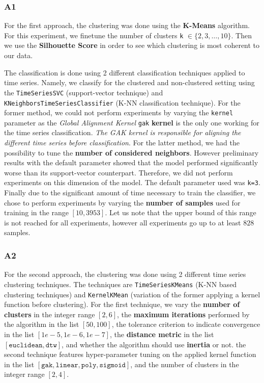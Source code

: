 \documentclass[sigplan,screen]{acmart}
\begin{document}
\subsubsection{A1}
For the first approach, the clustering was done using the \textbf{K-Means} algorithm. For this experiment, we finetune the number of clusters \texttt{k} $\in \{2,3,\ldots, 10\}$. Then we use the \textbf{Silhouette Score} in order to see which clustering is most coherent to our data. %

The classification is done using 2 different classification techniques applied to time series. Namely, we classify for the clustered and non-clustered setting using the \texttt{TimeSeriesSVC} (support-vector technique) and \\ \texttt{KNeighborsTimeSeriesClassifier} (K-NN classification technique). For the former method, we could not perform experiments by varying the \texttt{kernel} parameter as the \textit{Global Alignment Kernel} \texttt{gak} \textbf{kernel} is the only one working for the time series classification. \textit{The GAK kernel is responsible for aligning the different time series before classification}. For the latter method, we had the possibility to tune the \textbf{number of considered neighbors}. However preliminary results with the default parameter showed that the model performed significantly worse than its support-vector counterpart. Therefore, we did not perform experiments on this dimension of the model. The default parameter used was \texttt{k=3}. Finally due to the significant amount of time necessary to train the classifier, we chose to perform experiments by varying the \textbf{number of samples} used for training in the range $[10, 3953]$. Let us note that the upper bound of this range is not reached for all experiments, however all experiments go up to at least $828$ samples.

\subsubsection{A2}
For the second approach, the clustering was done using 2 different time series clustering techniques. The techniques are \texttt{TimeSeriesKMeans} (K-NN based clustering techniques) and \texttt{KernelKMean} (variation of the former applying a kernel function before clustering). For the first technique, we vary the \textbf{number of clusters} in the integer range $[2, 6]$, the \textbf{maximum iterations} performed by the algorithm in the list $[50, 100]$, the tolerance criterion to indicate convergence in the list $[1e-5, 1e-6, 1e-7]$, the \textbf{distance metric} in the list $[\texttt{euclidean}, \texttt{dtw}]$, and whether the algorithm should use \textbf{inertia} or not. the second technique features hyper-parameter tuning on the applied kernel function in the list $[\texttt{gak}, \texttt{linear}, \texttt{poly}, \texttt{sigmoid}]$, and the number of clusters in the integer range $[2, 4]$.
\end{document}
